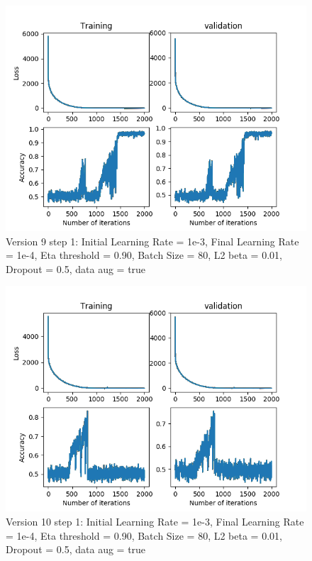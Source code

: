 \documentclass[12pt,reqno]{amsart}
\numberwithin{equation}{section}
\begin{document}
\begin{enumerate}
\begin{figure}[H]
\centering
\includegraphics[scale=0.6]{data_liquid140_version9_step1}
\caption{Version 9 step 1: Initial Learning Rate = 1e-3, Final Learning Rate = 1e-4, Eta threshold = 0.90, Batch Size = 80, L2 beta = 0.01, Dropout = 0.5, data aug = true}
\end{figure}

\begin{figure}[H]
\centering
\includegraphics[scale=0.6]{data_liquid140_version10_step1}
\caption{Version 10 step 1: Initial Learning Rate = 1e-3, Final Learning Rate = 1e-4, Eta threshold = 0.90, Batch Size = 80, L2 beta = 0.01, Dropout = 0.5, data aug = true}
\end{figure}


\end{enumerate}
\end{document}
